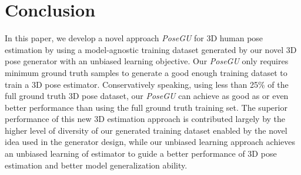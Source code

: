 \documentclass[runningheads]{llncs}
\begin{document}
\section{Conclusion}
In this paper, we develop a novel approach \textit{PoseGU} for 3D human pose estimation by using a model-agnostic training dataset generated by our novel 3D pose generator with an unbiased learning objective.
Our \textit{PoseGU} only requires minimum ground truth samples to generate a good enough training dataset to train a 3D pose estimator. 
Conservatively speaking, using less than 25\% of the full ground truth 3D pose dataset, our \textit{PoseGU} can achieve as good as or even better performance than using the full ground truth training set. 
The superior performance of this new 3D estimation approach is contributed largely by the higher level of diversity of our generated training dataset enabled by the novel idea used in the generator design, while our unbiased learning approach achieves an unbiased learning of estimator to guide a better performance of 3D pose estimation and better model generalization ability.







\clearpage


\end{document}
